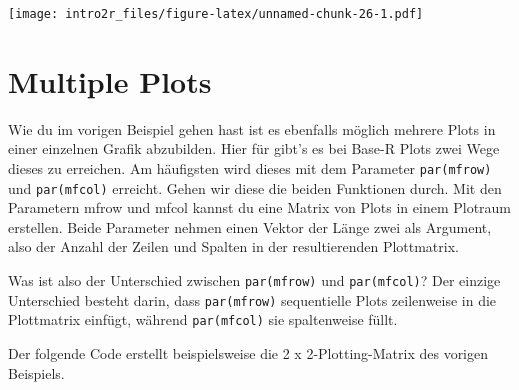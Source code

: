 \documentclass[
]{book}
\begin{document}
\texttt{[image: intro2r\_files/figure-latex/unnamed-chunk-26-1.pdf]}

\hypertarget{multiple-plots}{%
\section{Multiple Plots}\label{multiple-plots}}

Wie du im vorigen Beispiel gehen hast ist es ebenfalls möglich mehrere Plots in einer einzelnen Grafik abzubilden.
Hier für gibt's es bei Base-R Plots zwei Wege dieses zu erreichen.
Am häufigsten wird dieses mit dem Parameter \texttt{par(mfrow)} und \texttt{par(mfcol)} erreicht.
Gehen wir diese die beiden Funktionen durch. Mit den Parametern mfrow und mfcol kannst du eine Matrix von Plots in einem Plotraum erstellen.
Beide Parameter nehmen einen Vektor der Länge zwei als Argument, also der Anzahl der Zeilen und Spalten in der resultierenden Plottmatrix.

Was ist also der Unterschied zwischen \texttt{par(mfrow)} und \texttt{par(mfcol)}? Der einzige Unterschied besteht darin,
dass \texttt{par(mfrow)} sequentielle Plots zeilenweise in die Plottmatrix einfügt, während \texttt{par(mfcol)} sie spaltenweise füllt.

Der folgende Code erstellt beispielsweise die 2 x 2-Plotting-Matrix des vorigen Beispiels.
\end{document}
